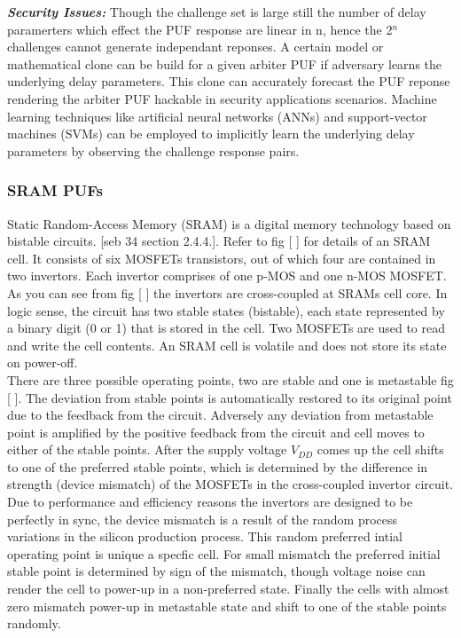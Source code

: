 \textbf{\emph{Security Issues:}}
Though the challenge set is large still the number of delay paramerters which effect the PUF response are linear in n, hence the 2$^n$ challenges cannot generate independant reponses. A certain model or mathematical clone can be build for a given arbiter PUF if adversary learns the underlying delay parameters. This clone can accurately forecast the PUF reponse rendering the arbiter PUF hackable in security applications scenarios. Machine learning techniques like artificial neural
networks (ANNs) and support-vector machines (SVMs) can be employed to implicitly learn the underlying delay parameters by observing the challenge response pairs.

\subsubsection{SRAM PUFs}
\label{srampufs}

Static Random-Access Memory (SRAM) is a digital memory technology based on bistable circuits. [seb 34 section 2.4.4.]. Refer to fig [ ] for details of an SRAM cell. It consists of six MOSFETs transistors, out of which four are contained in two invertors. Each invertor comprises of one p-MOS and one n-MOS MOSFET. As you can see from fig [ ] the invertors are cross-coupled at SRAMs cell core. In logic sense, the circuit has two stable states (bistable), each state represented by a binary
digit (0 or 1) that is stored in the cell. Two MOSFETs are used to read and write the cell contents. An SRAM cell is volatile and does not store its state on power-off.\\

There are three possible operating points, two are stable and one is metastable fig [ ]. The deviation from stable points is automatically restored to its original point due to the feedback from the circuit. Adversely any deviation from metastable point is amplified by the positive feedback from the circuit and cell moves to either of the stable points. After the supply voltage $V_{DD}$ comes up the cell shifts to one of the preferred stable points, which is determined by the difference in
strength (device mismatch) of the MOSFETs in the cross-coupled invertor circuit. Due to performance and efficiency reasons the invertors are designed to be perfectly in sync, the device mismatch is a result of the random process variations in the silicon production process. This random preferred intial operating point is unique a specfic cell. For small mismatch the preferred initial stable point is determined by sign of the mismatch, though voltage noise can render the cell to
power-up in a non-preferred state. Finally the cells with almost zero mismatch power-up in metastable state and shift to one of the stable points randomly.\\

